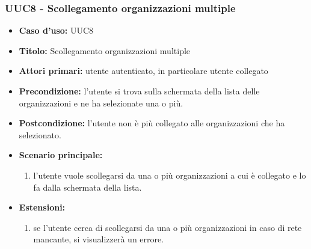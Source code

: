 \documentclass[casi-duso]{subfiles}
\begin{document}
\subsubsection{UUC8 - Scollegamento organizzazioni multiple}%
\label{subsub:UUC8utente}
\begin{itemize}
  \item \textbf{Caso d’uso:} UUC8
  \item \textbf{Titolo:} Scollegamento organizzazioni multiple
  \item \textbf{Attori primari:} utente autenticato, in particolare utente collegato
  \item \textbf{Precondizione:} l'utente si trova sulla schermata della lista delle organizzazioni e ne ha selezionate una o più.
  \item \textbf{Postcondizione:} l'utente non è più collegato alle organizzazioni che ha selezionato.
  \item \textbf{Scenario principale:}
        \begin{enumerate}
          \item l'utente vuole scollegarsi da una o più organizzazioni a cui è collegato e lo fa dalla schermata della lista.
        \end{enumerate}
  \item \textbf{Estensioni:}
        \begin{enumerate}
          \item se l'utente cerca di scollegarsi da una o più organizzazioni in caso di rete mancante, si visualizzerà un errore.
        \end{enumerate}
\end{itemize}

\end{document}

